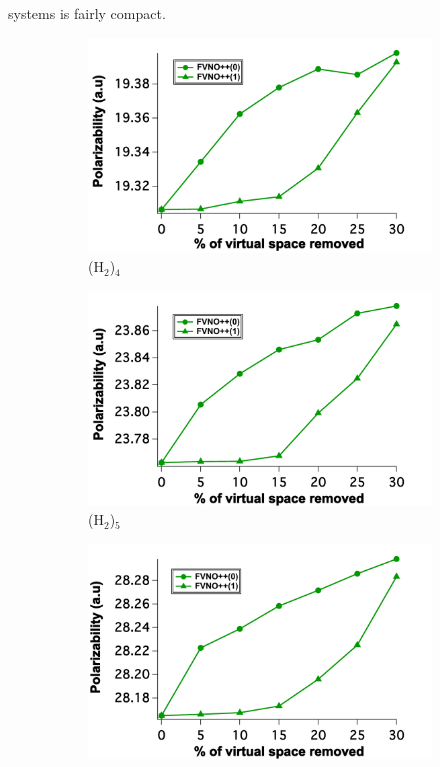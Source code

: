 systems is fairly compact. 
\begin{figure}
\begin{subfigure}{.5\textwidth}
  \centering
  \includegraphics[width=.9\linewidth]{figures_fvno++/fvno++_cc2_1_h2_4_adz_polar.pdf}
  \caption{(H$_2$)$_4$}
  \label{fig:sfig1}
\end{subfigure}%
\begin{subfigure}{.5\textwidth}
  \centering
  \includegraphics[width=.9\linewidth]{figures_fvno++/fvno++_cc2_1_h2_5_adz_polar.pdf}
  \caption{(H$_2$)$_5$}
  \label{fig:sfig2}
\end{subfigure}
\begin{subfigure}{.5\textwidth}
  \centering
  \includegraphics[width=.9\linewidth]{figures_fvno++/fvno++_cc2_1_h2_6_adz_polar.pdf}

\end{subfigure}
\end{figure}
